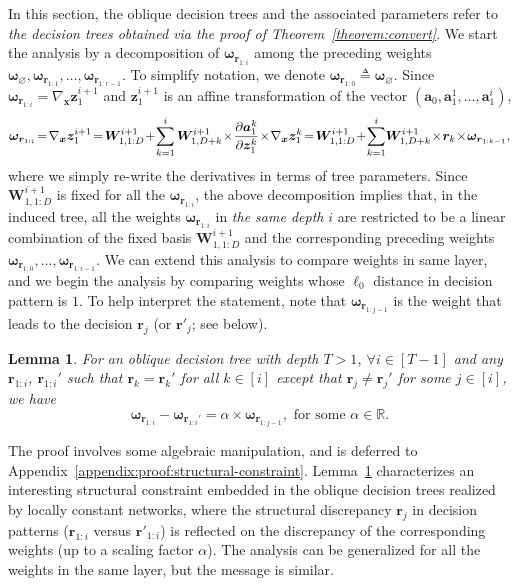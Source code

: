 \documentclass{article} \usepackage{iclr2020_conference,times}
\newtheorem{lemma}[theorem]{Lemma}
\def\va{{\bm{a}}}
\def\vr{{\bm{r}}}
\def\vomega{{\bm{\omega}}}
\def\vx{{\bm{x}}}
\def\vz{{\bm{z}}}
\def\mW{{\bm{W}}}
\def\sR{{\mathbb{R}}}
\begin{document}
In this section, the oblique decision trees and the associated parameters refer to \emph{the decision trees obtained via the proof of Theorem~\ref{theorem:convert}}. We start the analysis by a decomposition of $\vomega_{\vr_{1:i}}$ among the preceding weights $\vomega_{\varnothing},\vomega_{\vr_{1:1}},\dots,\vomega_{\vr_{1:r-1}}$. To simplify notation, we denote $\vomega_{\vr_{1:0}} \triangleq \vomega_\varnothing$.
Since $\vomega_{\vr_{1:i}} = \nabla_\vx \vz^{i+1}_1$ and $\vz^{i+1}_1$ is an affine transformation of the vector $(\va_0, \va^1_1,\dots, \va_1^i)$, 
\begin{align*}
\vspace{-1mm}
    \vomega_{\vr_{1:i}} \! = \! \nabla_\vx \vz^{i+1}_1 \! = \! \mW^{i+1}_{1, 1:D} \! + \! \sum_{k=1}^{i} \mW^{i+1}_{1, D+k} \! \times \! \frac{\partial \va^k_1}{\partial \vz^k_1} \! \times \! \nabla_\vx \vz^k_1 
    \! = \! \mW^{i+1}_{1, 1:D} \! + \! \sum_{k=1}^{i} \! \mW^{i+1}_{1, D+k} \! \times \! \vr_k \! \times \! \vomega_{\vr_{1:k-1}}, 
\vspace{-1mm}
\end{align*}
where we simply re-write the derivatives in terms of tree parameters. Since $\mW^{i+1}_{1, 1:D}$ is fixed for all the $\vomega_{\vr_{1:i}}$, the above decomposition implies that, in the induced tree, all the weights $\vomega_{\vr_{1:i}}$ in \emph{the same depth} $i$ are restricted to be a linear combination of the fixed basis $\mW^{i+1}_{1, 1:D}$ and the corresponding preceding weights $\vomega_{\vr_{1:0}},\dots,\vomega_{\vr_{1:i-1}}$.\!
We can extend this analysis to compare weights in same layer, and we begin the analysis by comparing weights whose $\ell_0$ distance in decision pattern is $1$. 
To help interpret the statement, note that $\vomega_{\vr_{1:j-1}}$ is the weight 
that leads to the decision $\vr_j$ (or $\vr'_j$; see below).
\begin{lemma}
For an oblique decision tree with depth $T > 1$, $\forall i \in [T-1]$ and any $\vr_{1:i}$, $\vr_{1:i}'$ such that $\vr_{k} = \vr_{k}'$ for all $k \in [i]$ except that $\vr_{j} \neq \vr_{j}'$ for some $j \in [i]$, we have
\vspace{-1mm}
\begin{equation*}
    \vomega_{\vr_{1:i}} - \vomega_{\vr_{1:i}'} =  \alpha \times \vomega_{\vr_{1:j-1}},\text{ for some } \alpha \in \sR.
\end{equation*}
\vspace{-6mm}
\label{lemma:structural-constraint}
\end{lemma}
The proof involves some algebraic manipulation, and is deferred to Appendix~\ref{appendix:proof:structural-constraint}. Lemma~\ref{lemma:structural-constraint} characterizes an interesting structural constraint embedded in the oblique decision trees realized by locally constant networks, where the structural discrepancy $\vr_j$ in decision patterns ($\vr_{1:i}$ versus $\vr'_{1:i}$) is reflected on the discrepancy of the corresponding weights (up to a scaling factor $\alpha$). The analysis can be generalized for all the weights in the same layer, but the message is similar. 
\end{document}
